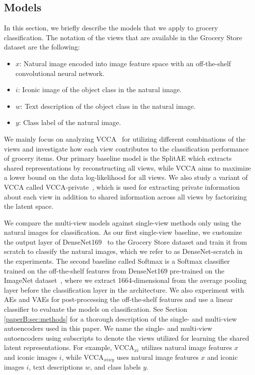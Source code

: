 \subsection{Models}

In this section, we briefly describe the models that we apply to grocery classification. The notation of the views that are available in the Grocery Store dataset are the following:
\begin{itemize}[topsep=1pt, noitemsep]%
    \item $x$: Natural image encoded into image feature space with an off-the-shelf convolutional neural network.
    \item $i$: Iconic image of the object class in the natural image.
    \item $w$: Text description of the object class in the natural image.
    \item $y$: Class label of the natural image.
\end{itemize}
We mainly focus on analyzing VCCA~ for utilizing different combinations of the views and investigate how each view contributes to the classification performance of grocery items. Our primary baseline model is the SplitAE which extracts shared representations by reconstructing all views, while VCCA aims to maximize a lower bound on the data log-likelihood for all views. We also study a variant of VCCA called VCCA-private~, which is used for extracting private information about each view in addition to shared information across all views by factorizing the latent space. 

We compare the multi-view models against single-view methods only using the natural images for classification. As our first single-view baseline, we customize the output layer of DenseNet169~ to %
the Grocery Store dataset and train it from scratch to classify the natural images, which we refer to as DenseNet-scratch in the experiments. The second baseline called Softmax is a Softmax classifier trained on the off-the-shelf features from DenseNet169 pre-trained on the ImageNet dataset~, where we extract 1664-dimensional from the average pooling layer before the classification layer in the architecture. We also experiment with AEs and VAEs for post-processing the off-the-shelf features and use a linear classifier to evaluate the models on classification. See Section \ref{paperB:sec:methods} %
for a thorough description of the single- and multi-view autoencoders used in this paper. We name the single- and multi-view autoencoders using subscripts to denote the views utilized for learning the shared latent representations. For example, VCCA$_{x i}$ utilizes natural image features $x$ and iconic images $i$, while VCCA$_{x i w y}$ uses natural image features $x$ and iconic images $i$, text descriptions $w$, and class labels $y$.


